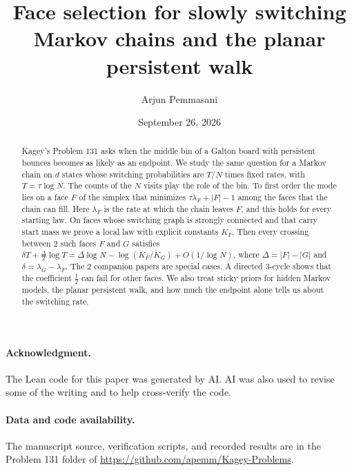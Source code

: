 \documentclass[11pt]{article}
\title{Face selection for slowly switching Markov chains
 and the planar persistent walk}
\author{Arjun Pemmasani}
\date{September 26, 2026}
\theoremstyle{definition}
\theoremstyle{remark}
\begin{document}
\maketitle

\begin{abstract}
Kagey's Problem 131 asks when the middle bin of a Galton board with
persistent bounces becomes as likely as an endpoint. We study the same
question for a Markov chain on $d$ states whose switching probabilities are
$T/N$ times fixed rates, with $T=\tau\log N$. The counts of the $N$ visits
play the role of the bin. To first order the mode lies on a face $F$ of the
simplex that minimizes $\tau\lambda_F+\lvert F\rvert-1$ among the faces that
the chain can fill. Here $\lambda_F$ is the rate at which the chain leaves
$F$, and this holds for every starting law. On faces whose switching graph is
strongly connected and that carry start mass we prove a local law with
explicit constants $K_F$. Then every crossing between 2 such faces $F$ and $G$
satisfies
$\delta T+\frac{\Delta}{2}\log T=\Delta\log N-\log(K_F/K_G)+O(1/\log N)$,
where $\Delta=\lvert F\rvert-\lvert G\rvert$ and $\delta=\lambda_G-\lambda_F$.
The 2 companion papers are special cases. A directed 3-cycle shows that the
coefficient $\frac12$ can fail for other faces. We also treat sticky priors
for hidden Markov models, the planar persistent walk, and how much the
endpoint alone tells us about the switching rate.
\end{abstract}











\paragraph{Acknowledgment.}
The Lean code for this paper was generated by AI. AI was also used to
revise some of the writing and to help cross-verify the code.

\paragraph{Data and code availability.}
The manuscript source, verification scripts, and recorded results are
in the Problem 131 folder of
\url{https://github.com/apemm/Kagey-Problems}.

\appendix





\end{document}
